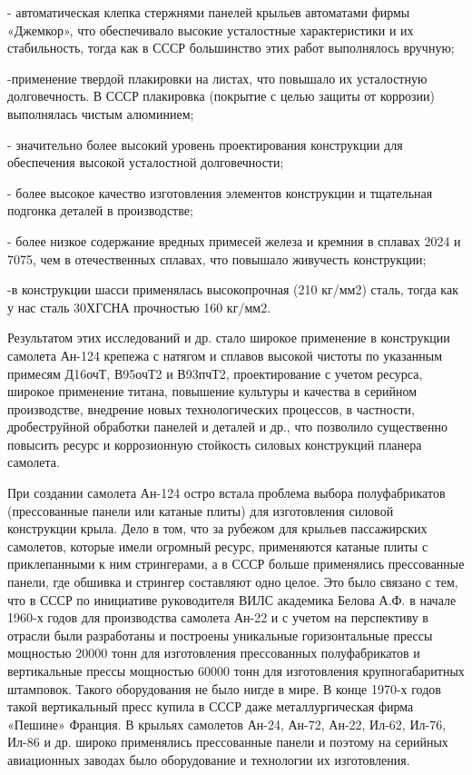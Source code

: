 - автоматическая клепка стержнями панелей крыльев автоматами фирмы «Джемкор»,
что обеспечивало высокие усталостные характеристики и их стабильность, тогда
как в СССР большинство этих работ выполнялось вручную;

-применение твердой плакировки на листах, что повышало их усталостную
долговечность. В СССР плакировка (покрытие с целью защиты от коррозии)
выполнялась чистым алюминием;

- значительно более высокий уровень проектирования конструкции для обеспечения
высокой усталостной долговечности;

- более высокое качество изготовления элементов конструкции и тщательная
подгонка деталей в производстве;

- более низкое содержание вредных примесей железа и кремния в сплавах 2024 и
7075, чем в отечественных сплавах, что повышало живучесть конструкции;

-в конструкции шасси применялась высокопрочная (210 кг/мм2) сталь, тогда как у
нас сталь 30ХГСНА прочностью 160 кг/мм2.

Результатом этих исследований и др. стало широкое применение в конструкции
самолета Ан-124 крепежа с натягом и сплавов высокой чистоты по указанным
примесям Д16очТ, В95очТ2 и В93пчТ2, проектирование с учетом ресурса, широкое
применение титана, повышение культуры и качества в серийном производстве,
внедрение новых технологических процессов, в частности, дробеструйной обработки
панелей и деталей и др., что позволило существенно повысить ресурс и
коррозионную стойкость силовых конструкций планера самолета.

При создании самолета Ан-124 остро встала проблема выбора полуфабрикатов
(прессованные панели или катаные плиты) для изготовления силовой конструкции
крыла. Дело в том, что за рубежом для крыльев пассажирских самолетов, которые
имели огромный ресурс, применяются катаные плиты с приклепанными к ним
стрингерами, а в СССР больше применялись прессованные панели, где обшивка и
стрингер составляют одно целое. Это было связано с тем, что в СССР по
инициативе руководителя ВИЛС академика Белова А.Ф. в начале 1960-х годов для
производства самолета Ан-22 и с учетом на перспективу в отрасли были
разработаны и построены уникальные горизонтальные прессы мощностью 20000 тонн
для изготовления прессованных полуфабрикатов и вертикальные прессы мощностью
60000 тонн для изготовления крупногабаритных штамповок. Такого оборудования не
было нигде в мире. В конце 1970-х годов такой вертикальный пресс купила в СССР
даже металлургическая фирма «Пешине» Франция. В крыльях самолетов Ан-24, Ан-72,
Ан-22, Ил-62, Ил-76, Ил-86 и др. широко применялись прессованные панели и
поэтому на серийных авиационных заводах было оборудование и технологии их
изготовления.


